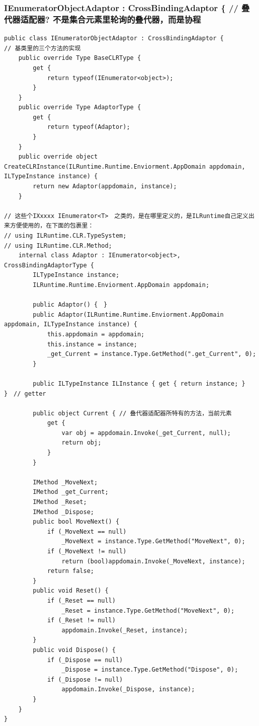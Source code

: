 \documentclass[9pt, b5paper]{article}
\begin{document}
\subsubsection{IEnumeratorObjectAdaptor : CrossBindingAdaptor \{ // 叠代器适配器? 不是集合元素里轮询的叠代器，而是协程}
\label{sec-5-1-2}
\begin{verbatim}
public class IEnumeratorObjectAdaptor : CrossBindingAdaptor { 
// 基类里的三个方法的实现
    public override Type BaseCLRType {
        get {
            return typeof(IEnumerator<object>);
        }
    }
    public override Type AdaptorType {
        get {
            return typeof(Adaptor);
        }
    }
    public override object CreateCLRInstance(ILRuntime.Runtime.Enviorment.AppDomain appdomain, ILTypeInstance instance) {
        return new Adaptor(appdomain, instance);
    }

// 这些个IXxxxx IEnumerator<T>　之类的，是在哪里定义的，是ILRuntime自己定义出来方便使用的，在下面的包裹里：　
// using ILRuntime.CLR.TypeSystem;
// using ILRuntime.CLR.Method;
    internal class Adaptor : IEnumerator<object>, CrossBindingAdaptorType {
        ILTypeInstance instance;
        ILRuntime.Runtime.Enviorment.AppDomain appdomain;

        public Adaptor() {　}
        public Adaptor(ILRuntime.Runtime.Enviorment.AppDomain appdomain, ILTypeInstance instance) {
            this.appdomain = appdomain;
            this.instance = instance;
            _get_Current = instance.Type.GetMethod(".get_Current", 0);
        }

        public ILTypeInstance ILInstance { get { return instance; } }　// getter

        public object Current { // 叠代器适配器所特有的方法，当前元素
            get {
                var obj = appdomain.Invoke(_get_Current, null);
                return obj;
            }
        }

        IMethod _MoveNext;
        IMethod _get_Current;
        IMethod _Reset;
        IMethod _Dispose;
        public bool MoveNext() {
            if (_MoveNext == null) 
                _MoveNext = instance.Type.GetMethod("MoveNext", 0);
            if (_MoveNext != null)
                return (bool)appdomain.Invoke(_MoveNext, instance);
            return false;
        }
        public void Reset() {
            if (_Reset == null) 
                _Reset = instance.Type.GetMethod("MoveNext", 0);
            if (_Reset != null)
                appdomain.Invoke(_Reset, instance);
        }
        public void Dispose() {
            if (_Dispose == null) 
                _Dispose = instance.Type.GetMethod("Dispose", 0);
            if (_Dispose != null)
                appdomain.Invoke(_Dispose, instance);
        }
    }
}
\end{verbatim}
\end{document}
